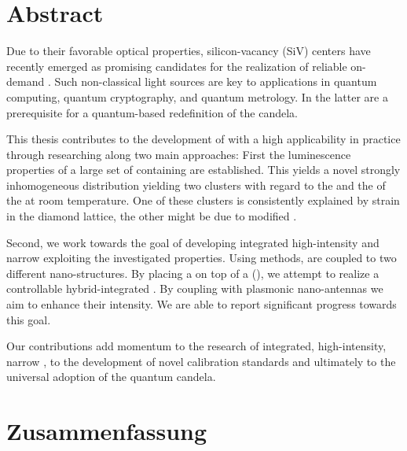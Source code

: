 
\null\vfill

\section*{Abstract}

	Due to their favorable optical properties, silicon-vacancy (SiV) centers have recently emerged as promising candidates for the realization of reliable on-demand \spss. 
	Such non-classical light sources are key to applications in quantum computing, quantum cryptography, and quantum metrology. 
	In the latter \spss are a prerequisite for a quantum-based redefinition of the candela.

	This thesis contributes to the development of \spss with a high applicability in practice through researching \sivs along two main approaches: 
	First the luminescence properties of a large set of \nds containing \sivs are established. 
	This yields a novel strongly inhomogeneous distribution yielding two clusters with regard to the \cwls and the \lw of the \zpl at room temperature.
	One of these clusters is consistently explained by strain in the diamond lattice, the other might be due to modified \sivs.

	Second, we work towards the goal of developing integrated high-intensity and narrow \lw \spss exploiting the investigated \siv properties.
	Using \pp methods, \sivs are coupled to two different nano-structures.
	By placing a \nd on top of a \vcsel (\VCSEL), we attempt to realize a controllable hybrid-integrated \sps. 
	By coupling \sivs with plasmonic nano-antennas we aim to enhance their \pl intensity. We are able to report significant progress towards this goal.

	Our contributions add momentum to the research of integrated, high-intensity, narrow \lw \spss, to the development of novel calibration standards and ultimately to the universal adoption of the quantum candela.




\vfill

\newpage

\null\vfill

\section*{Zusammenfassung}

